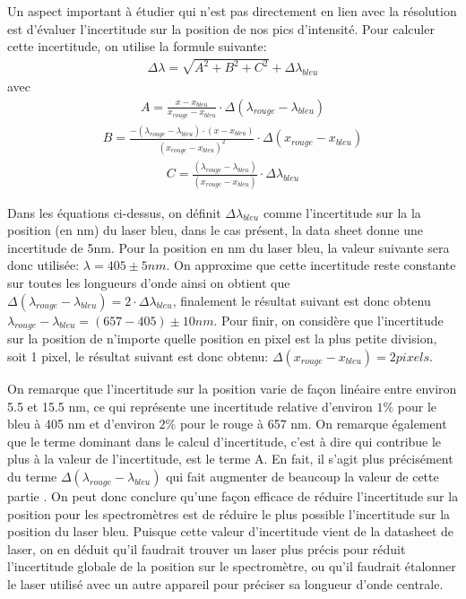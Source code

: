 \documentclass[11pt,letterpaper]{article}
\begin{document}
Un aspect important à étudier qui n'est pas directement en lien avec la résolution est d'évaluer l'incertitude sur 
la position de nos pics d'intensité. Pour calculer cette incertitude, on utilise la formule suivante: 
\begin{align}
  \Delta \lambda =\sqrt{A^{2}+B^{2}+C^{2}}+\Delta \lambda _{bleu}
\end{align}
avec 
\begin{align}
  A=\frac{x-x_{bleu}}{x_{rouge}-x_{bleu}}\cdot \Delta\left ( \lambda _{rouge}-\lambda _{bleu} \right )
\end{align}
\begin{align}
  B=\frac{-(\lambda _{rouge}-\lambda _{bleu})\cdot (x-x_{bleu})}{(x_{rouge}-x_{bleu})^{2}} \cdot \Delta \left ( x_{rouge}-x_{bleu} \right )
\end{align}
\begin{align}
  C=\frac{(\lambda _{rouge}-\lambda _{bleu})}{(x_{rouge}-x_{bleu})}\cdot \Delta \lambda _{bleu}
\end{align}

Dans les équations ci-dessus, on définit $\Delta \lambda _{bleu}$ comme l'incertitude sur la la position (en nm)
du laser bleu, dans le cas présent, la data sheet donne une incertitude de 5nm. Pour la position en nm du laser bleu,
la valeur suivante sera donc utilisée: $ \lambda = 405\pm 5 nm$. On approxime que cette incertitude reste constante sur 
toutes les longueurs d'onde ainsi on obtient que $\Delta\left ( \lambda _{rouge}-\lambda _{bleu} \right )=2\cdot \Delta \lambda _{bleu}$, 
finalement le résultat suivant est donc obtenu $\lambda _{rouge}-\lambda _{bleu}= (657-405)\pm 10 nm$.
Pour finir, on considère que l'incertitude sur la position de n'importe quelle position en pixel est la plus petite
division, soit 1 pixel, le résultat suivant est donc obtenu: $\Delta \left ( x_{rouge}-x_{bleu} \right )=2 pixels$.

On remarque que l’incertitude sur la position varie de façon linéaire entre environ 5.5 et 15.5 nm, ce qui représente une
incertitude relative d'environ $1\%$ pour le bleu à 405 nm et d'environ $2\%$ pour le rouge à 657 nm. On remarque 
également que le terme dominant dans le calcul d'incertitude, 
c'est à dire qui contribue le plus à la valeur de l'incertitude, est le terme A. 
En fait, il s’agit plus précisément du terme $\Delta\left ( \lambda _{rouge}-\lambda _{bleu} \right )$ qui fait augmenter de beaucoup
la valeur de cette partie . On peut donc conclure qu'une façon efficace de réduire l'incertitude sur la position pour
les spectromètres est de réduire le plus possible l’incertitude sur la position du laser bleu. Puisque cette valeur d'incertitude
vient de la datasheet de laser, on en déduit qu'il faudrait trouver un laser plus précis pour réduit l'incertitude 
globale de la position sur le spectromètre, ou qu'il faudrait étalonner le laser utilisé avec un autre appareil pour préciser
sa longueur d'onde centrale. 
\end{document}
